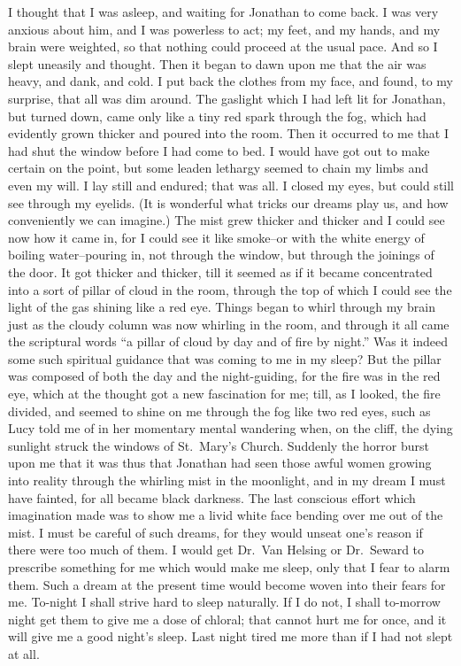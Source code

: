 \documentclass[12pt,openright]{book}
\begin{document}
I thought that I was asleep, and waiting for Jonathan to come back. I was very anxious about him, and I was powerless to act; my feet, and my hands, and my brain were weighted, so that nothing could proceed at the usual pace. And so I slept uneasily and thought. Then it began to dawn upon me that the air was heavy, and dank, and cold. I put back the clothes from my face, and found, to my surprise, that all was dim around. The gaslight which I had left lit for Jonathan, but turned down, came only like a tiny red spark through the fog, which had evidently grown thicker and poured into the room. Then it occurred to me that I had shut the window before I had come to bed. I would have got out to make certain on the point, but some leaden lethargy seemed to chain my limbs and even my will. I lay still and endured; that was all. I closed my eyes, but could still see through my eyelids. (It is wonderful what tricks our dreams play us, and how conveniently we can imagine.) The mist grew thicker and thicker and I could see now how it came in, for I could see it like smoke–or with the white energy of boiling water–pouring in, not through the window, but through the joinings of the door. It got thicker and thicker, till it seemed as if it became concentrated into a sort of pillar of cloud in the room, through the top of which I could see the light of the gas shining like a red eye. Things began to whirl through my brain just as the cloudy column was now whirling in the room, and through it all came the scriptural words “a pillar of cloud by day and of fire by night.” Was it indeed some such spiritual guidance that was coming to me in my sleep? But the pillar was composed of both the day and the night-guiding, for the fire was in the red eye, which at the thought got a new fascination for me; till, as I looked, the fire divided, and seemed to shine on me through the fog like two red eyes, such as Lucy told me of in her momentary mental wandering when, on the cliff, the dying sunlight struck the windows of St. Mary’s Church. Suddenly the horror burst upon me that it was thus that Jonathan had seen those awful women growing into reality through the whirling mist in the moonlight, and in my dream I must have fainted, for all became black darkness. The last conscious effort which imagination made was to show me a livid white face bending over me out of the mist. I must be careful of such dreams, for they would unseat one’s reason if there were too much of them. I would get Dr. Van Helsing or Dr. Seward to prescribe something for me which would make me sleep, only that I fear to alarm them. Such a dream at the present time would become woven into their fears for me. To-night I shall strive hard to sleep naturally. If I do not, I shall to-morrow night get them to give me a dose of chloral; that cannot hurt me for once, and it will give me a good night’s sleep. Last night tired me more than if I had not slept at all.
\end{document}
